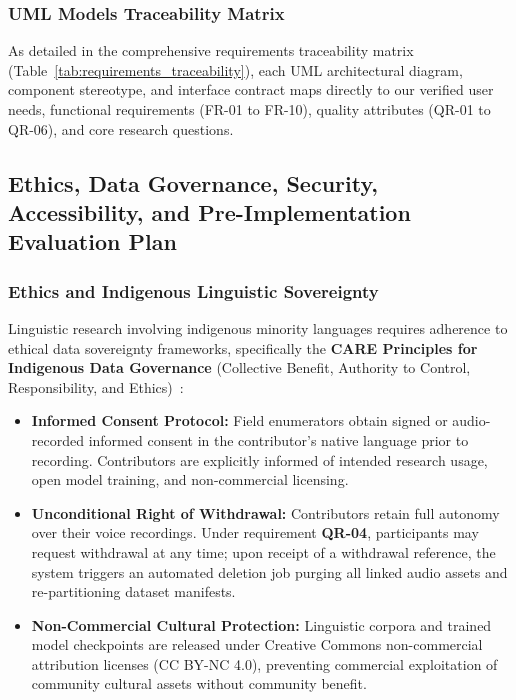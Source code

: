 \documentclass[conference]{IEEEtran}
\begin{document}
\subsubsection{UML Models Traceability Matrix}
\label{sec:design:uml:matrix}
As detailed in the comprehensive requirements traceability matrix (Table~\ref{tab:requirements_traceability}), each UML architectural diagram, component stereotype, and interface contract maps directly to our verified user needs, functional requirements (FR-01 to FR-10), quality attributes (QR-01 to QR-06), and core research questions.
\subsection{Ethics, Data Governance, Security, Accessibility, and Pre-Implementation Evaluation Plan}
\label{sec:design:governance}

\subsubsection{Ethics and Indigenous Linguistic Sovereignty}
\label{sec:design:gov:ethics}
Linguistic research involving indigenous minority languages requires adherence to ethical data sovereignty frameworks, specifically the \textbf{CARE Principles for Indigenous Data Governance} (Collective Benefit, Authority to Control, Responsibility, and Ethics)~\cite{carroll2020care}:
\begin{itemize}
    \item \textbf{Informed Consent Protocol:} Field enumerators obtain signed or audio-recorded informed consent in the contributor's native language prior to recording. Contributors are explicitly informed of intended research usage, open model training, and non-commercial licensing.
    \item \textbf{Unconditional Right of Withdrawal:} Contributors retain full autonomy over their voice recordings. Under requirement \textbf{QR-04}, participants may request withdrawal at any time; upon receipt of a withdrawal reference, the system triggers an automated deletion job purging all linked audio assets and re-partitioning dataset manifests.
    \item \textbf{Non-Commercial Cultural Protection:} Linguistic corpora and trained model checkpoints are released under Creative Commons non-commercial attribution licenses (CC BY-NC 4.0), preventing commercial exploitation of community cultural assets without community benefit.
\end{itemize}
\end{document}
